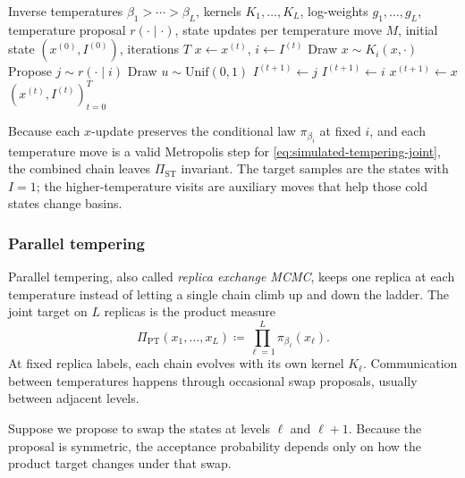 \begin{algorithm}[H]
  \caption{Simulated tempering}
  \label{alg:simulated-tempering}
  \begin{algorithmic}[1]
    \Require Inverse temperatures $\beta_1>\cdots>\beta_L$, kernels $K_1,\dots,K_L$, log-weights $g_1,\dots,g_L$, temperature proposal $r(\cdot\mid \cdot)$, state updates per temperature move $M$, initial state $(x^{(0)},I^{(0)})$, iterations $T$
      \State $x \gets x^{(t)}$, $i \gets I^{(t)}$
        \State Draw $x \sim K_i(x,\cdot)$
      \EndFor
      \State Propose $j \sim r(\cdot\mid i)$
      \State Draw $u \sim \mathrm{Unif}(0,1)$
        \State $I^{(t+1)} \gets j$
      \Else
        \State $I^{(t+1)} \gets i$
      \EndIf
      \State $x^{(t+1)} \gets x$
    \EndFor
    \State \Return $(x^{(t)},I^{(t)})_{t=0}^T$
  \end{algorithmic}
\end{algorithm}

Because each $x$-update preserves the conditional law $\pi_{\beta_i}$ at fixed $i$, and each temperature move is a valid Metropolis step for \eqref{eq:simulated-tempering-joint}, the combined chain leaves $\Pi_{\mathrm{ST}}$ invariant.
The target samples are the states with $I=1$; the higher-temperature visits are auxiliary moves that help those cold states change basins.

\subsubsection{Parallel tempering}
\label{subsubsec:parallel-tempering}

Parallel tempering, also called \emph{replica exchange MCMC}, keeps one replica at each temperature instead of letting a single chain climb up and down the ladder.
The joint target on $L$ replicas is the product measure
\begin{equation}
  \Pi_{\mathrm{PT}}(x_1,\dots,x_L)
  \coloneqq
  \prod_{\ell=1}^L \pi_{\beta_\ell}(x_\ell).
  \label{eq:parallel-tempering-joint}
\end{equation}
At fixed replica labels, each chain evolves with its own kernel $K_\ell$.
Communication between temperatures happens through occasional swap proposals, usually between adjacent levels.

Suppose we propose to swap the states at levels $\ell$ and $\ell+1$.
Because the proposal is symmetric, the acceptance probability depends only on how the product target changes under that swap.

